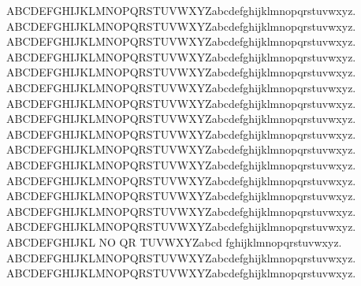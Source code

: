 
\multirm  ABCDEFGHIJKLMNOPQRSTUVWXYZabcdefghijklmnopqrstuvwxyz.
\multiol  ABCDEFGHIJKLMNOPQRSTUVWXYZabcdefghijklmnopqrstuvwxyz.
\multitR   ABCDEFGHIJKLMNOPQRSTUVWXYZabcdefghijklmnopqrstuvwxyz.
\multitd   ABCDEFGHIJKLMNOPQRSTUVWXYZabcdefghijklmnopqrstuvwxyz.
\multitset ABCDEFGHIJKLMNOPQRSTUVWXYZabcdefghijklmnopqrstuvwxyz.
\multitM   ABCDEFGHIJKLMNOPQRSTUVWXYZabcdefghijklmnopqrstuvwxyz.
\multibaM   ABCDEFGHIJKLMNOPQRSTUVWXYZabcdefghijklmnopqrstuvwxyz.
\multitrM   ABCDEFGHIJKLMNOPQRSTUVWXYZabcdefghijklmnopqrstuvwxyz.
\multimc   ABCDEFGHIJKLMNOPQRSTUVWXYZabcdefghijklmnopqrstuvwxyz.
\multiop   ABCDEFGHIJKLMNOPQRSTUVWXYZabcdefghijklmnopqrstuvwxyz.
\multids   ABCDEFGHIJKLMNOPQRSTUVWXYZabcdefghijklmnopqrstuvwxyz.
\multiset  ABCDEFGHIJKLMNOPQRSTUVWXYZabcdefghijklmnopqrstuvwxyz.
\multirsfs ABCDEFGHIJKLMNOPQRSTUVWXYZabcdefghijklmnopqrstuvwxyz.
\multipz   ABCDEFGHIJKLMNOPQRSTUVWXYZabcdefghijklmnopqrstuvwxyz.
\multiM    ABCDEFGHIJKLMNOPQRSTUVWXYZabcdefghijklmnopqrstuvwxyz.
\multiR    ABCDEFGHIJKL NO QR TUVWXYZabcd fghijklmnopqrstuvwxyz.
\multibb   ABCDEFGHIJKLMNOPQRSTUVWXYZabcdefghijklmnopqrstuvwxyz.
\multiRM   ABCDEFGHIJKLMNOPQRSTUVWXYZabcdefghijklmnopqrstuvwxyz.
\newcommand{\RRM}{\R{M}}
\newcommand{\RRP}{\R{P}}
\newcommand{\RRe}{\R{e}}
\newcommand{\RRS}{\R{S}}

\newcommand{\dotleq}{\buildrel \textstyle  .\over {\smash{\lower
      .2ex\hbox{\ensuremath\leqslant}}\vphantom{=}}}
\newcommand{\dotgeq}{\buildrel \textstyle  .\over {\smash{\lower
      .2ex\hbox{\ensuremath\geqslant}}\vphantom{=}}}

\DeclareMathOperator*{\argmin}{arg\,min}
\DeclareMathOperator*{\argmax}{arg\,max}


\newcommand{\esm}{\ensuremath}

\newcommand{\bM}{\begin{bmatrix}}
\newcommand{\eM}{\end{bmatrix}}
\newcommand{\bSM}{\left[\begin{smallmatrix}}
\newcommand{\eSM}{\end{smallmatrix}\right]}
\renewcommand*\env@matrix[1][*\c@MaxMatrixCols c]{%
  \hskip -\arraycolsep
  \let\@ifnextchar\new@ifnextchar
  \array{#1}}



